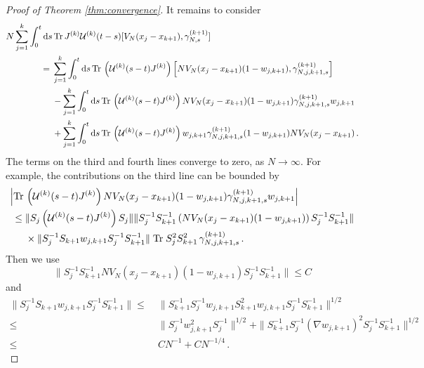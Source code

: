 \documentclass[11pt]{article}
\newcommand{\rd}{{\rm d}}
\newcommand{\cU}{{\cal U}}
\newcommand{\tr}{\mbox{Tr}}
\begin{document}
\begin{proof}[Proof of Theorem \ref{thm:convergence}]
It remains to consider
\begin{equation}\label{eq:conv-6}
\begin{split}
N \sum_{j=1}^k \int_0^t \rd s &\, \tr \, J^{(k)} \cU^{(k)} (t-s) [
V_N (x_j -x_{k+1}) , \gamma_{N,s}^{(k+1)} ]
\\ = \; &\sum_{j=1}^k \int_0^t \rd s \, \tr \, \left(\cU^{(k)} (s-t)
J^{(k)}\right) \left[ N V_N (x_j -x_{k+1}) (1-w_{j,k+1}),
\gamma_{N,j,k+1,s}^{(k+1)} \right] \\ &- \sum_{j=1}^k \int_0^t \rd s
\, \tr \, \left(\cU^{(k)} (s-t) J^{(k)}\right) N V_N (x_j -x_{k+1})
(1-w_{j,k+1}) \gamma_{N,j,k+1,s}^{(k+1)} w_{j,k+1}
\\ &+\sum_{j=1}^k \int_0^t \rd s \, \tr \, \left(\cU^{(k)} (s-t)
J^{(k)}\right) w_{j,k+1} \gamma_{N,j,k+1,s}^{(k+1)} (1-w_{j,k+1}) N
V_N (x_j -x_{k+1})\,.
\end{split}
\end{equation}
The terms on the third and fourth lines converge to zero, as $N \to
\infty$. For example, the contributions on the third line can be
bounded by
\begin{equation}
\begin{split}
 \Big| \tr \, &\left(\cU^{(k)} (s-t) J^{(k)}\right)  N V_N (x_j -x_{k+1})
(1-w_{j,k+1}) \gamma_{N,j,k+1,s}^{(k+1)} w_{j,k+1} \Big| \\ \leq \;
& \| S_j \left(\cU^{(k)} (s-t) J^{(k)}\right) S_j \| \| S_j^{-1}
S_{k+1}^{-1} \left(N V_N (x_j -x_{k+1}) (1-w_{j,k+1})\right)
S_j^{-1} S_{k+1}^{-1} \|  \\ &\times \| S_j^{-1} S_{k+1} w_{j,k+1}
S_j^{-1} S_{k+1}^{-1} \| \; \tr \; S_j^2 S_{k+1}^2 \,
\gamma_{N,j,k+1,s}^{(k+1)}\,.
\end{split}
\end{equation}
Then we use
\begin{equation}
\| S_j^{-1} S_{k+1}^{-1} NV_N (x_j -x_{k+1}) (1-w_{j,k+1}) S_j^{-1}
S_{k+1}^{-1} \| \leq C \end{equation}
and
\begin{equation}\label{eq:SwS}
\begin{split}
\|S_j^{-1} S_{k+1} w_{j,k+1} S_j^{-1} S_{k+1}^{-1} \|
\leq  & \; \Big\| S_{k+1}^{-1} S_j^{-1} w_{j,k+1} S_{k+1}^2 w_{j,k+1}
S_j^{-1} S_{k+1}^{-1} \Big\|^{1/2} \\
\leq & \;\| S_j^{-1} w_{j,k+1}^2 S_j^{-1} \|^{1/2}
  + \|  S_{k+1}^{-1} S_j^{-1} (\nabla w_{j,k+1})^2
 S_j^{-1}  S_{k+1}^{-1}\|^{1/2} \\
\leq & \;  C N^{-1} + CN^{-1/4}\,.
\end{split}

\end{equation}
\end{proof}
\end{document}
